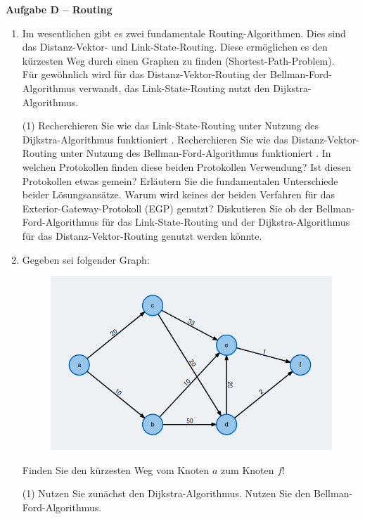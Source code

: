 \documentclass[paper=a4,fontsize=11pt]{scrartcl}%
\numberwithin{equation}{section}
\begin{document}
\begin{center}\Large{\textbf{Aufgabe D -- Routing}}\end{center}\vskip0.2in
\begin{enumerate}
	\item Im wesentlichen gibt es zwei fundamentale Routing-Algorithmen. Dies sind das Distanz-Vektor- und Link-State-Routing. Diese ermöglichen es den kürzesten Weg durch einen Graphen zu finden (Shortest-Path-Problem).\\
	Für gewöhnlich wird für das Distanz-Vektor-Routing der Bellman-Ford-Algorithmus verwandt, das Link-State-Routing nutzt den Dijkstra-Algorithmus. \cite[S. 363ff]{Kurose2012}
	\begin{tasks}(1)
		\task Recherchieren Sie wie das Link-State-Routing unter Nutzung des Dijkstra-Algorithmus funktioniert \cite[S. 366]{Kurose2012}.
		\task Recherchieren Sie wie das Distanz-Vektor-Routing unter Nutzung des Bellman-Ford-Algorithmus funktioniert  \cite[S. 371]{Kurose2012}.
		\task In welchen Protokollen finden diese beiden Protokollen Verwendung? Ist diesen Protokollen etwas gemein?
		\task Erläutern Sie die fundamentalen Unterschiede beider Lösungsansätze.
		\task Warum wird keines der beiden Verfahren für das Exterior-Gateway-Protokoll (EGP) genutzt?
		\task Diskutieren Sie ob der Bellman-Ford-Algorithmus für das Link-State-Routing und der Dijkstra-Algorithmus für das Distanz-Vektor-Routing genutzt werden könnte.
	\end{tasks}
	\item Gegeben sei folgender Graph:
	\begin{figure}[H]
		\centering
		\includegraphics[scale=0.4]{dijkstra_example}
	\end{figure}
	Finden Sie den kürzesten Weg vom Knoten $a$ zum Knoten $f$!
	\begin{tasks}(1)
		\task Nutzen Sie zunächst den Dijkstra-Algorithmus.
		\task Nutzen Sie den Bellman-Ford-Algorithmus.
	\end{tasks}
\end{enumerate}
\end{document}
